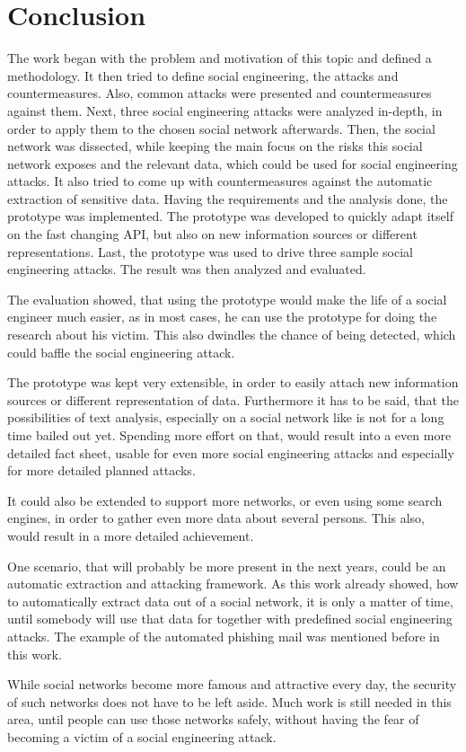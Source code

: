 \chapter{Conclusion}
\label{chap:conclusion}

The work began with the problem and motivation of this topic and defined a
methodology. It then tried to define social engineering, the attacks and
countermeasures. Also, common attacks were presented and countermeasures
against them. Next, three social engineering attacks were analyzed in-depth, in
order to apply them to the chosen social network afterwards. Then, the
\Twitter{} social network was dissected, while keeping the main focus on the
risks this social network exposes and the relevant data, which could be used
for social engineering attacks. It also tried to come up with countermeasures
against the automatic extraction of sensitive data. Having the requirements and
the analysis done, the prototype was implemented. The prototype was developed
to quickly adapt itself on the fast changing \Twitter{} API, but also on new
information sources or different representations. Last, the prototype was used
to drive three sample social engineering attacks. The result was then analyzed
and evaluated.

The evaluation showed, that using the prototype would make the life of a social
engineer much easier, as in most cases, he can use the prototype for doing the
research about his victim. This also dwindles the chance of being detected,
which could baffle the social engineering attack.

The prototype was kept very extensible, in order to easily attach new
information sources or different representation of data. Furthermore it has to
be said, that the possibilities of text analysis, especially on a social
network like \Twitter{} is not for a long time bailed out yet. Spending more
effort on that, would result into a even more detailed fact sheet, usable for
even more social engineering attacks and especially for more detailed planned
attacks.

It could also be extended to support more networks, or even using some search
engines, in order to gather even more data about several persons. This also,
would result in a more detailed achievement.

One scenario, that will probably be more present in the next years, could be an
automatic extraction and attacking framework. As this work already showed, how
to automatically extract data out of a social network, it is only a matter of
time, until somebody will use that data for together with predefined social
engineering attacks. The example of the automated phishing mail was mentioned
before in this work.

While social networks become more famous and attractive every day, the security
of such networks does not have to be left aside. Much work is still needed in
this area, until people can use those networks safely, without having the fear
of becoming a victim of a social engineering attack.
